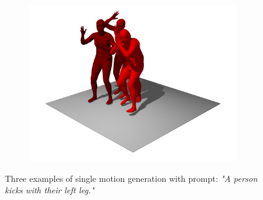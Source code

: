 \begin{figure}
\begin{subfigure}{0.32\linewidth}
        \includegraphics[width=\linewidth]{figures/results/single-kick3.png}
    \end{subfigure}
    \caption{Three examples of single motion generation with prompt: \textit{"A person kicks with their left leg."}}
\end{figure}

